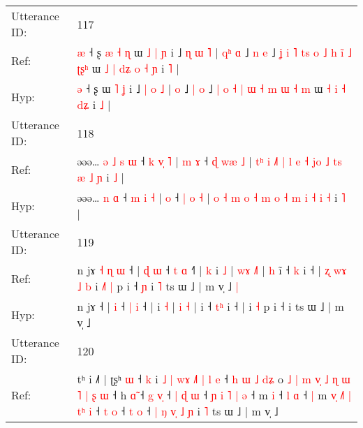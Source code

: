\documentclass[10pt]{article}
\DeclareRobustCommand{\hl}[1]{{\textcolor{red}{#1}}}
\begin{document}
\begin{longtable}{ll}
 \\
\midrule
Utterance ID: & 117 \\
Ref: & \hl{æ} ˧ ʂ\hl{ }\hl{æ}\hl{ }\hl{˧}\hl{ }\hl{ɳ} ɯ\hl{ }\hl{˩} \hl{|} \hl{ɲ} i ˩ \hl{ɳ} \hl{ɯ} \hl{˥} |\hl{ }\hl{q}\hl{ʰ} \hl{ɑ} ˩ \hl{n} \hl{e} ˩ \hl{ʝ} \hl{i} \hl{˥} \hl{t}\hl{s} \hl{o} \hl{˩} \hl{h} \hl{i}\hl{̃} \hl{˩} \hl{ʈ}\hl{ʂ}\hl{ʰ} ɯ\hl{ }\hl{˩} \hl{|} \hl{d}\hl{ʑ} \hl{o} \hl{˧}\hl{ }\hl{ɲ} i \hl{˥} |
 \\
Hyp: & \hl{ə} ˧ ʂ\hl{}\hl{}\hl{}\hl{}\hl{}\hl{} ɯ\hl{}\hl{} \hl{˥} \hl{ʝ} i ˩ \hl{|} \hl{o} \hl{˩} |\hl{}\hl{}\hl{} \hl{o} ˩ \hl{|} \hl{o} ˩ \hl{|} \hl{o} \hl{˧} \hl{}\hl{|} \hl{ɯ} \hl{˧} \hl{m} \hl{}\hl{ɯ} \hl{˧} \hl{}\hl{}\hl{m} ɯ\hl{}\hl{} \hl{˧} \hl{}\hl{i} \hl{˧} \hl{}\hl{d}\hl{ʑ} i \hl{˩} |
 \\
\midrule
Utterance ID: & 118 \\
Ref: & əəə…\hl{ }\hl{ə}\hl{ }\hl{˩} \hl{s} \hl{ɯ} ˧ \hl{k} \hl{v}\hl{̩} \hl{˥} |\hl{ }\hl{m} \hl{ɤ} ˧ \hl{ɖ} \hl{w}\hl{æ} \hl{˩} | \hl{t}\hl{ʰ} \hl{i} \hl{˩}\hl{˥} \hl{|} \hl{l} \hl{e} \hl{˧} \hl{j}\hl{o} \hl{˩} \hl{t}\hl{s} \hl{æ} \hl{˩} \hl{ɲ} i \hl{˩} |
 \\
Hyp: & əəə…\hl{}\hl{}\hl{}\hl{} \hl{n} \hl{ɑ} ˧ \hl{m} \hl{}\hl{i} \hl{˧} |\hl{}\hl{} \hl{o} ˧ \hl{|} \hl{}\hl{o} \hl{˧} | \hl{}\hl{o} \hl{˧} \hl{}\hl{m} \hl{o} \hl{˧} \hl{m} \hl{o} \hl{}\hl{˧} \hl{m} \hl{}\hl{i} \hl{˧} \hl{i} \hl{˧} i \hl{˥} |
 \\
\midrule
Utterance ID: & 119 \\
Ref: & n jɤ\hl{ }\hl{˧}\hl{ }\hl{ɳ}\hl{ }\hl{ɯ} ˧ |\hl{ }\hl{ɖ} \hl{ɯ} ˧ \hl{t} \hl{ɑ} ˧\hl{˥} |\hl{ }\hl{k} i \hl{˩} | \hl{w}\hl{ɤ} \hl{˩}\hl{˥} |\hl{ }\hl{h} i\hl{̃} ˧ \hl{}\hl{k} i ˧ |\hl{ }\hl{ʐ}\hl{ }\hl{w}\hl{ɤ}\hl{ }\hl{˩}\hl{ }\hl{b} i\hl{ }\hl{˩}\hl{˥} \hl{|} p i ˧\hl{ }\hl{ɲ} i\hl{ }\hl{˥} ts ɯ ˩ | m v̩ ˩\hl{ }\hl{|}
 \\
Hyp: & n jɤ\hl{}\hl{}\hl{}\hl{}\hl{}\hl{} ˧ |\hl{}\hl{} \hl{i} ˧ \hl{|} \hl{i} ˧\hl{} |\hl{}\hl{} i \hl{˧} | \hl{}\hl{i} \hl{}\hl{˧} |\hl{}\hl{} i\hl{} ˧ \hl{t}\hl{ʰ} i ˧ |\hl{}\hl{}\hl{}\hl{}\hl{}\hl{}\hl{}\hl{}\hl{} i\hl{}\hl{}\hl{} \hl{˧} p i ˧\hl{}\hl{} i\hl{}\hl{} ts ɯ ˩ | m v̩ ˩\hl{}\hl{}
 \\
\midrule
Utterance ID: & 120 \\
Ref: & tʰ i ˩˥ | ʈʂʰ \hl{ɯ} ˧ \hl{k} i\hl{ }\hl{˩} \hl{|} \hl{w}\hl{ɤ} \hl{˩}\hl{˥} \hl{|} \hl{l} \hl{e} ˧ \hl{h} \hl{ɯ} \hl{˩} \hl{d}\hl{ʑ} o\hl{ }\hl{˩}\hl{ }\hl{|}\hl{ }\hl{m}\hl{ }\hl{v}\hl{̩}\hl{ }\hl{˩}\hl{ }\hl{ɳ}\hl{ }\hl{ɯ}\hl{ }\hl{˥}\hl{ }\hl{|}\hl{ }\hl{ʂ}\hl{ }\hl{ɯ} ˧ h \hl{ɑ}\hl{̃} ˧ \hl{g} \hl{v}\hl{̩} ˧\hl{ }\hl{|} \hl{ɖ} \hl{ɯ} ˧\hl{ }\hl{ɲ}\hl{ }\hl{i}\hl{ }\hl{˥} \hl{|} \hl{ə} ˧ m \hl{i} ˧ \hl{l} \hl{ɑ} ˧\hl{ }\hl{|} m\hl{ }\hl{v}\hl{̩}\hl{ }\hl{˩}\hl{˥}\hl{ }\hl{|}\hl{ }\hl{t}\hl{ʰ} \hl{i} ˧ \hl{t} \hl{o} ˧ \hl{t} \hl{o} ˧ \hl{|} \hl{ŋ} \hl{v}\hl{̩} \hl{˩} \hl{ɲ} i \hl{˥} ts ɯ ˩ | m v̩ ˩

\end{longtable}
\end{document}
